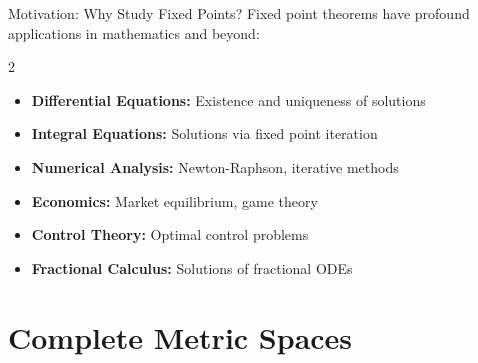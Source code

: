 \documentclass[aspectratio=169,10pt]{beamer}
\begin{document}
\begin{frame}{Motivation: Why Study Fixed Points?}
    Fixed point theorems have profound applications in mathematics and beyond:

    \begin{multicols}{2}
        \begin{itemize}
            \item \textbf{Differential Equations:} Existence and uniqueness of solutions
            \item \textbf{Integral Equations:} Solutions via fixed point iteration
            \item \textbf{Numerical Analysis:} Newton-Raphson, iterative methods
            \item \textbf{Economics:} Market equilibrium, game theory
            \item \textbf{Control Theory:} Optimal control problems
            \item \textbf{Fractional Calculus:} Solutions of fractional ODEs
        \end{itemize}
    \end{multicols}

    \vspace{0.3cm}
    \vspace{0.2cm}
\end{frame}

\section{Complete Metric Spaces}
\end{document}
